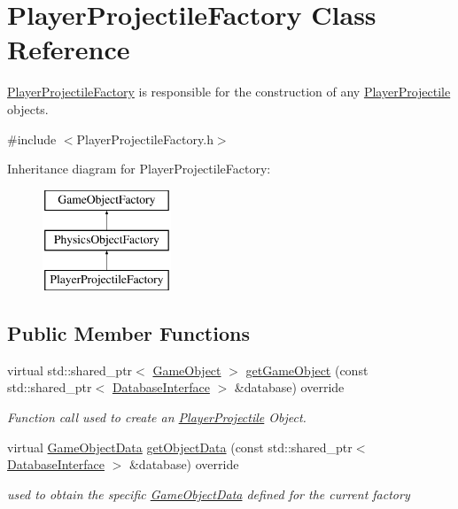 \hypertarget{class_player_projectile_factory}{}\section{Player\+Projectile\+Factory Class Reference}
\label{class_player_projectile_factory}


\hyperlink{class_player_projectile_factory}{Player\+Projectile\+Factory} is responsible for the construction of any \hyperlink{class_player_projectile}{Player\+Projectile} objects.  




{\ttfamily \#include $<$Player\+Projectile\+Factory.\+h$>$}

Inheritance diagram for Player\+Projectile\+Factory\+:\begin{figure}[H]
\begin{center}
\leavevmode
\includegraphics[height=3.000000cm]{d7/dd5/class_player_projectile_factory}
\end{center}
\end{figure}
\subsection*{Public Member Functions}
\begin{DoxyCompactItemize}
\item 
virtual std\+::shared\+\_\+ptr$<$ \hyperlink{class_game_object}{Game\+Object} $>$ \hyperlink{class_player_projectile_factory_a804a9f591ce6f0a7fb04f35ff685ff57}{get\+Game\+Object} (const std\+::shared\+\_\+ptr$<$ \hyperlink{class_database_interface}{Database\+Interface} $>$ \&database) override
\begin{DoxyCompactList}\small\item\em Function call used to create an \hyperlink{class_player_projectile}{Player\+Projectile} Object. \end{DoxyCompactList}\item 
virtual \hyperlink{struct_game_object_data}{Game\+Object\+Data} \hyperlink{class_player_projectile_factory_a702ae964c9dc653140fad4e17f38f60a}{get\+Object\+Data} (const std\+::shared\+\_\+ptr$<$ \hyperlink{class_database_interface}{Database\+Interface} $>$ \&database) override
\begin{DoxyCompactList}\small\item\em used to obtain the specific \hyperlink{struct_game_object_data}{Game\+Object\+Data} defined for the current factory \end{DoxyCompactList}\end{DoxyCompactItemize}


